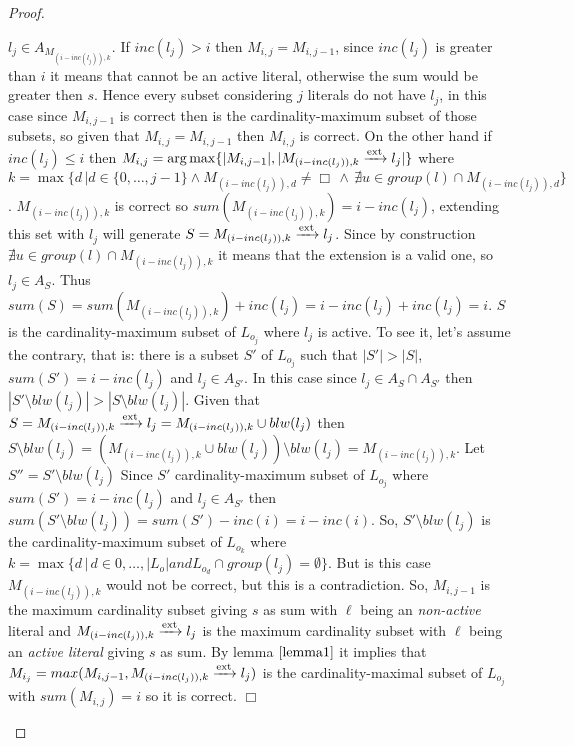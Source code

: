 \begin{proof}
\begin{itemize}
            $l_j \in A_{M_{(i-inc(l_j)),k}}$.
            If $inc(l_j) > i$ then $M_{i,j} =  M_{i,j-1}$, since $inc(l_j)$ is greater 
            than $i$ it means that cannot be an active literal, otherwise the sum would be greater then $s$.
            Hence every subset considering $j$ literals do not have $l_j$, in this case since $M_{i,j-1}$ is correct then  
            is the cardinality-maximum subset of those subsets, so given that $M_{i,j} =  M_{i,j-1}$ then 
            $M_{i,j}$ is correct.
            On the other hand if $inc(l_j) \le i$ then $M_{i,j} = \arg \max \{|M_{i,j-1}|, |M_{(i-inc(l_j)),k} \xrightarrow{\text{ext}} l_j|\}$
            where $k = \max \{d \, | d \in \{0, \hdots, j-1\} \land M_{(i-inc(l_j)),d} \ne \Box 
            \, \land \, \nexists u \in group(l) \cap M_{(i-inc(l_j)),d} \}$.
            $M_{(i-inc(l_j)),k}$ is correct so $sum(M_{(i-inc(l_j)),k}) = i-inc(l_j)$, extending this set with $l_j$
            will generate $S = M_{(i-inc(l_j)),k} \xrightarrow{\text{ext}} l_j$.
            Since by construction $\nexists u \in group(l) \cap M_{(i-inc(l_j)),k}$ it means that 
            the extension is a valid one, so $l_j \in A_S$.
            Thus $sum(S) = sum(M_{(i-inc(l_j)),k}) + inc(l_j) = i-inc(l_j) + inc(l_j) = i$.
            $S$ is the cardinality-maximum subset of $L_{o_j}$ where $l_j$ is active.
            To see it, let's assume the contrary, that is: there is a subset $S'$ of $L_{o_j}$
            such that $|S'| > |S| $, $sum(S') = i - inc(l_j)$ and $l_j \in A_{S'}$. In this case since $l_j \in A_S \cap A_{S'}$ 
            then $|S' \setminus blw(l_j)| > |S \setminus blw(l_j)|$.
            Given that $S = M_{(i-inc(l_j)),k} \xrightarrow{\text{ext}} l_j = M_{(i-inc(l_j)),k} \cup blw(l_j)$ then
            $S \setminus blw(l_j) = (M_{(i-inc(l_j)),k} \cup blw(l_j)) \setminus blw(l_j) = M_{(i-inc(l_j)),k}$.
            Let $S'' = S' \setminus blw(l_j)$
            Since $S'$ cardinality-maximum subset of $L_{o_j}$ where 
            $sum(S') = i - inc(l_j)$ and $l_j \in A_{S'}$ then $sum(S' \setminus blw(l_j))= sum(S') - inc(i) = i - inc(i).$
            So, $S' \setminus blw(l_j)$ is the cardinality-maximum subset of $L_{o_k}$ where 
            $k = \max\{d \, | \, d \in {0, \hdots, |L_o|} and L_{o_d} \cap group(l_j) = \emptyset\}$.
            But is this case $M_{(i-inc(l_j)),k}$ would not be correct, but this is a contradiction.
            So, $M_{i,j-1}$ is the maximum cardinality subset giving $s$ as sum with $\ell$ being an \textit{non-active} literal
            and $M_{(i-inc(l_j)),k} \xrightarrow{\text{ext}} l_j$ is the maximum cardinality subset 
            with $\ell$ being an \textit{active literal} giving $s$  as sum.
            By lemma $\ref{lemma1}$ it implies that $M_{i_j} = max(M_{i,j-1}, M_{(i-inc(l_j)),k} \xrightarrow{\text{ext}} l_j)$ 
            is the cardinality-maximal subset of $L_{o_j}$ with $sum(M_{i,j}) = i$
            so it is correct.
            $\Box$
    \end{itemize}


\end{proof}
